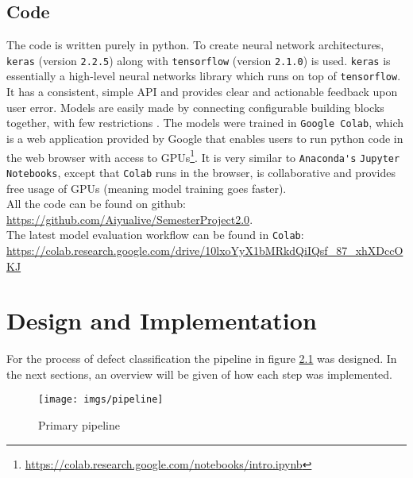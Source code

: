 \section{Code}
\label{int:sec:code}
The code is written purely in python. To create neural network architectures, \verb|keras| (version \verb|2.2.5|) along with \verb|tensorflow| (version \verb|2.1.0|) is used. \verb|keras| is essentially a high-level neural networks library which runs on top of \verb|tensorflow|. It has a consistent, simple API and provides clear and actionable feedback upon user error. Models are easily made by connecting configurable building blocks together, with few restrictions \cite{TensorFl31:online}. The models were trained in \verb|Google Colab|, which is a web application provided by Google that enables users to run python code in the web browser with access to GPUs\footnote{\url{https://colab.research.google.com/notebooks/intro.ipynb}}. It is very similar to \verb|Anaconda's| \verb|Jupyter Notebooks|, except that \verb|Colab| runs in the browser, is collaborative and provides free usage of GPUs (meaning model training goes faster).\\


\noindent All the code can be found on github: \\
\url{https://github.com/Aiyualive/SemesterProject2.0}.\\

\noindent The latest model evaluation workflow can be found in \verb|Colab|:\\
\url{https://colab.research.google.com/drive/10lxoYyX1bMRkdQiIQsf_87_xhXDccOKJ}



\chapter{Design and Implementation}
For the process of defect classification the pipeline in figure \ref{fig:pipeline} was designed. In the next sections, an overview will be given of how each step was implemented.
\begin{figure}[H]
	\centering
	\texttt{[image: imgs/pipeline]}
	\caption{Primary pipeline}
	\label{fig:pipeline}
\end{figure}



